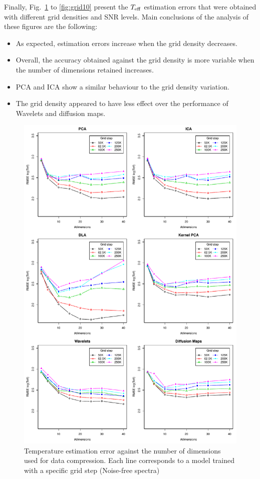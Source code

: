 \documentclass[a4paper,fleqn,usenatbib]{mnras}
\begin{document}
{{{Finally, Fig.~\ref{fig:gridpure} to \ref{fig:grid10} present the
$T_{\rm eff}$ estimation errors that were obtained with different 
grid densities and SNR levels. Main conclusions of the analysis 
of these figures are the following:

\begin{itemize}
\item As expected, estimation errors increase when the grid 
	density decreases.
\item Overall, the accuracy obtained against the grid density 
	is more variable when the number of dimensions retained 
	increases. 
\item PCA and ICA show a similar behaviour to the grid density 
	variation. 
\item The grid density appeared to have less effect over the 
	performance of Wavelets and diffusion maps.
\end{itemize}


\begin{figure}
\centering\includegraphics[height=0.95\textheight]{bestSVM_Teff_N-RMSE_HR10_pure_all.pdf}
\caption{Temperature estimation error against the number of dimensions
  used for data compression. Each line corresponds to a model trained
  with a specific grid step (Noise-free spectra)}
\label{fig:gridpure}
\end{figure}

}}}
\end{document}
